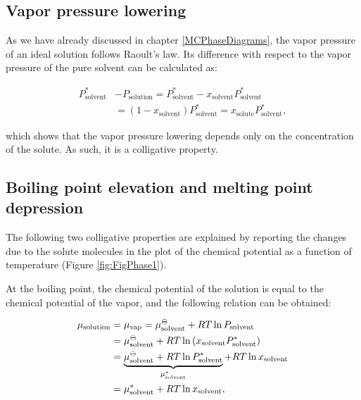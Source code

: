 \documentclass[
  9pt,
]{extbook}
\theoremstyle{definition}
\theoremstyle{definition}
\theoremstyle{definition}
\theoremstyle{remark}
\begin{document}
\hypertarget{vapor-pressure-lowering}{%
\subsection{Vapor pressure lowering}\label{vapor-pressure-lowering}}

As we have already discussed in chapter \ref{MCPhaseDiagrams}, the vapor pressure of an ideal solution follows Raoult's law. Its difference with respect to the vapor pressure of the pure solvent can be calculated as:

\begin{equation}
\begin{aligned}
P_{\text{solvent}}^* &- P_{\text{solution}} = P_{\text{solvent}}^* - x_{\text{solvent}} P_{\text{solvent}}^* \\ 
& = \left( 1-x_{\text{solvent}}\right)P_{\text{solvent}}^* =x_{\text{solute}} P_{\text{solvent}}^*,
\end{aligned}
\label{eq:coll2}
\end{equation}

which shows that the vapor pressure lowering depends only on the concentration of the solute. As such, it is a colligative property.

\hypertarget{boiling-point-elevation-and-melting-point-depression}{%
\subsection{Boiling point elevation and melting point depression}\label{boiling-point-elevation-and-melting-point-depression}}

The following two colligative properties are explained by reporting the changes due to the solute molecules in the plot of the chemical potential as a function of temperature (Figure \ref{fig:FigPhase1}).

At the boiling point, the chemical potential of the solution is equal to the chemical potential of the vapor, and the following relation can be obtained:

\begin{equation}
\begin{aligned}
\mu_{\text{solution}} &=\mu_{\text{vap}}=\mu_{\text{solvent}}^{{-\kern-6pt{\ominus}\kern-6pt-}} + RT \ln P_{\text{solvent}} \\
&= \mu_{\text{solvent}}^{{-\kern-6pt{\ominus}\kern-6pt-}} + RT \ln \left(x_{\text{solvent}} P_{\text{solvent}}^* \right)\\
&= \underbrace{\mu_{\text{solvent}}^{{-\kern-6pt{\ominus}\kern-6pt-}} + RT \ln P_{\text{solvent}}^*}_{\mu_{\text{solvent}}^*} + RT \ln x_{\text{solvent}} \\
&= \mu_{\text{solvent}}^* + RT \ln x_{\text{solvent}},
\end{aligned}
\label{eq:collA}
\end{equation}
\end{document}
